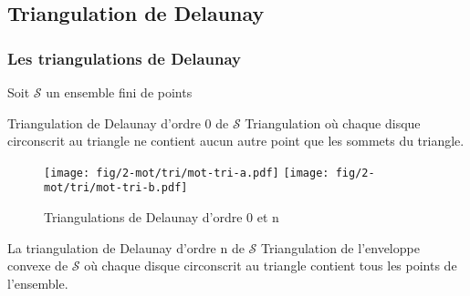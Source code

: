 \subsection{Triangulation de Delaunay}

\begin{frame}
\frametitle{Les triangulations de Delaunay}

Soit $\mathcal{S}$ un ensemble fini de points

\begin{block}{Triangulation de Delaunay d'ordre 0 de $\mathcal{S}$}
  Triangulation où chaque disque circonscrit au triangle ne contient aucun autre point que les sommets du triangle.
\end{block}
   
\begin{figure}[H]
  \centering
  \texttt{[image: fig/2-mot/tri/mot-tri-a.pdf]}
  \texttt{[image: fig/2-mot/tri/mot-tri-b.pdf]}
  \caption{Triangulations de Delaunay d'ordre 0 et n}
\end{figure}

\begin{block}{La triangulation de Delaunay d'ordre n de $\mathcal{S}$}
  Triangulation de l'enveloppe convexe de $\mathcal{S}$ où chaque disque circonscrit au triangle contient tous les points de l'ensemble.
\end{block}

\end{frame}
